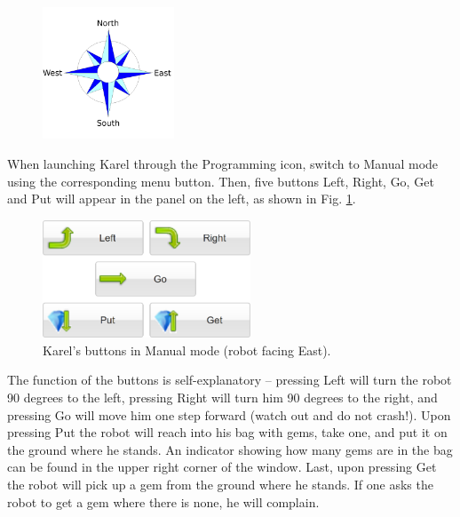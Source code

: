 \begin{figure}[!ht]
\begin{center}
\includegraphics[width=0.35\textwidth]{imgk/compass.png}
\vspace{-0mm}
\end{center}
\vspace{-1cm}
\end{figure}

\noindent
When launching Karel through the Programming icon, switch to Manual mode using the corresponding 
menu button. Then, five buttons Left, Right, Go, Get and Put will appear in the panel on the left,
as shown in Fig. \ref{fig:buttons}.

\begin{figure}[!ht]
\begin{center}
\includegraphics[width=6.2cm]{imgk/buttons-all.png}
\vspace{-0mm}
\caption{Karel's buttons in Manual mode (robot facing East).}
\label{fig:buttons}
\end{center}
\end{figure}
\noindent
The function of the buttons is self-explanatory -- pressing Left will turn the robot 90 degrees to the left,
pressing Right will turn him 90 degrees to the right, and pressing Go will move him one step forward 
(watch out and do not crash!). Upon pressing Put the robot will reach into his bag with gems, 
take one, and put it on the ground where he stands. 
An indicator showing how many gems are in the bag can be found in the upper right 
corner of the window. Last, upon pressing 
Get the robot will pick up a gem from the ground where he stands. If 
one asks the robot to get a gem where there is none, he will complain.

